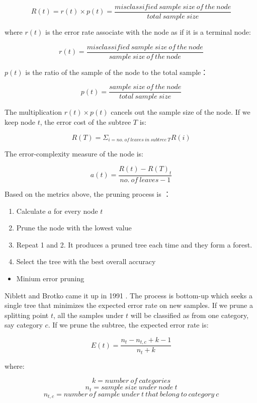 \documentclass[
  12pt,
]{krantz}
\providecommand{\tightlist}{%
  \setlength{\itemsep}{0pt}\setlength{\parskip}{0pt}}
\begin{document}
\[R(t)=r(t)\times p(t) = \frac{misclassified\ sample\ size\ of\ the\ node}{total\ sample\ size}\]

where \(r(t)\) is the error rate associate with the node as if it is a terminal node:

\[r(t)=\frac{misclassified\ sample\ size\ of\ the\ node}{sample\ size\ of\ the\ node}\]

\(p(t)\) is the ratio of the sample of the node to the total sample：

\[p(t)=\frac{ sample\ size\ of\ the\ node}{total\ sample\ size}\]

The multiplication \(r(t)\times p(t)\) cancels out the sample size of the node. If we keep node \(t\), the error cost of the subtree \(T\) is:

\[R(T)=\Sigma_{i = no.\ of\ leaves\ in\ subtree\ T} R(i)\]

The error-complexity measure of the node is:

\[a(t)=\frac{R(t)-R(T)_{t}}{no.\ of\ leaves - 1}\]

Based on the metrics above, the pruning process is \citep{Nikita2012}：

\begin{enumerate}
\def\labelenumi{\arabic{enumi}.}
\tightlist
\item
  Calculate \(a\) for every node \(t\)
\item
  Prune the node with the lowest value
\item
  Repeat 1 and 2. It produces a pruned tree each time and they form a forest.
\item
  Select the tree with the best overall accuracy
\end{enumerate}

\begin{itemize}
\tightlist
\item
  Minium error pruning
\end{itemize}

Niblett and Brotko came it up in 1991 \citep{Cestnik1991}. The process is bottom-up which seeks a single tree that minimizes the expected error rate on new samples. If we prune a splitting point \(t\), all the samples under \(t\) will be classified as from one category, say category \(c\). If we prune the subtree, the expected error rate is:

\[E(t)=\frac{n_{t}-n_{t,c}+k-1}{n_{t}+k}\]

where:

\[k=number\ of\ categories\]
\[n_{t}=sample\ size\ under\ node\ t\]
\[n_{t,c}= number\ of\ sample\ under\ t\ that\ belong\ to\ category\ c\]
\end{document}

